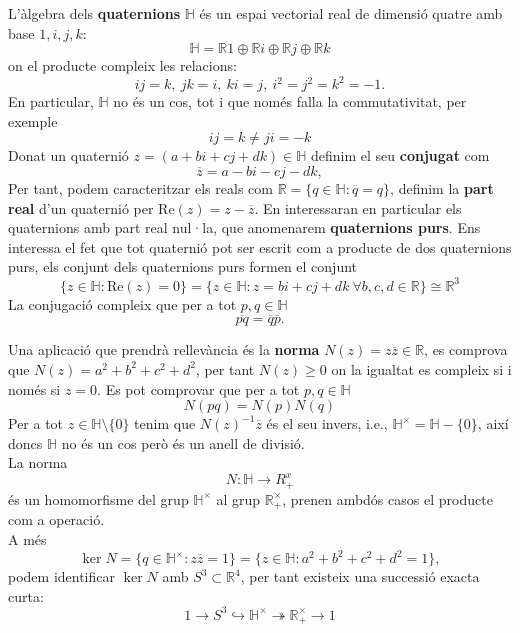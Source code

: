 \begin{definition}
L'àlgebra dels \textbf{quaternions} $\mathbb{H}$ és un espai vectorial real de dimensió quatre amb base $1,i,j,k$:
$$
\mathbb{H}=\mathbb{R}1\oplus \mathbb{R}i \oplus \mathbb{R} j \oplus \mathbb{R}k
$$
on el producte compleix les relacions:
$$
ij=k,\ jk=i, \ ki=j, \ i^2=j^2=k^2=-1.
$$
En particular, $\mathbb{H}$ no és un cos, tot i que només falla la commutativitat, per exemple
$$
ij=k\neq ji=-k
$$
Donat un quaternió $z=(a+bi+cj+dk)\in  \mathbb{H}$ definim el seu \textbf{conjugat} com
$$
\overline{z}=a-bi-cj-dk,
$$
Per tant, podem caracteritzar els reals com $\mathbb{R}=\{q\in \mathbb{H}: \overline{q}=q\}$, definim la \textbf{part real} d'un quaternió per $\text{Re}(z)=z-\overline{z}$. En interessaran en particular els quaternions amb part real nul·la, que anomenarem \textbf{quaternions purs}. Ens interessa el fet que tot quaternió pot ser escrit com a producte de dos quaternions purs, els conjunt dels quaternions purs formen el conjunt 
$$\{z\in \mathbb{H} : \text{Re}(z)=0\}=\{z\in \mathbb{H} : z=bi+cj+dk \ \forall b,c,d\in \mathbb{R}\}\cong \mathbb{R}^3$$
La conjugació compleix que per a tot $p,q\in \mathbb{H}$
$$
\overline{pq}=\overline{q}\overline{p}.
$$


Una aplicació que prendrà rellevància és la \textbf{norma} $N(z)=z\overline{z}\in \mathbb{R}$, es comprova que $N(z)=a^2+b^2+c^2+d^2$, per tant $N(z)\geq 0$ on la igualtat es compleix  si i només si $z=0$. Es pot comprovar que per a tot $p,q\in \mathbb{H}$
$$
N(pq)=N(p)N(q)
$$
Per a tot $z\in \mathbb{H}\setminus \{0\}$ tenim que $N(z)^{-1}\overline{z}$ és el seu invers, i.e., $\mathbb{H}^\times=\mathbb{H}-\{ 0 \}$, així doncs $\mathbb{H}$ no és un cos però és un anell de divisió.\\
La norma $$N:\mathbb{H}\rightarrow R^x_+$$ és un homomorfisme del grup $\mathbb{H}^\times$ al grup $\mathbb{R}_+^\times$, prenen ambdós casos el producte com a operació. \\
A més
\begin{equation*}
\ker N = \{ q\in \mathbb{H}^\times : z\overline{z}=1 \} = \{z \in \mathbb{H} : a^2+b^2+c^2+d^2=1\},
\end{equation*}
podem identificar $\ker N$ amb $S^3\subset \mathbb{R}^4$, per tant existeix una successió exacta curta:
\begin{equation}\label{commutador}
1 \rightarrow S^3 \hookrightarrow \mathbb{H^\times} \twoheadrightarrow \mathbb{R}_+^\times \rightarrow 1
\end{equation}

\end{definition}

